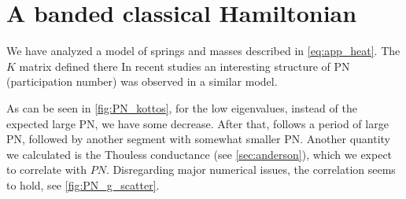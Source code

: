 \section{A banded classical Hamiltonian}


We have analyzed a model of springs and masses described in \autoref{eq:app_heat}.
The $K$ matrix defined there 
In recent studies \cite{bodyfelt_unpub} an interesting structure of
PN (participation number) was observed in a similar model. 

As can be seen
in \autoref{fig:PN_kottos}, for the low eigenvalues, instead of the 
expected large PN, we have some decrease. After that, follows a period
of large PN, followed by another segment with somewhat smaller PN.
Another quantity we calculated is the Thouless conductance (see \autoref{sec:anderson}), 
which we expect to correlate with $PN$. Disregarding major numerical issues,
the correlation seems to hold, see \autoref{fig:PN_g_scatter}.

